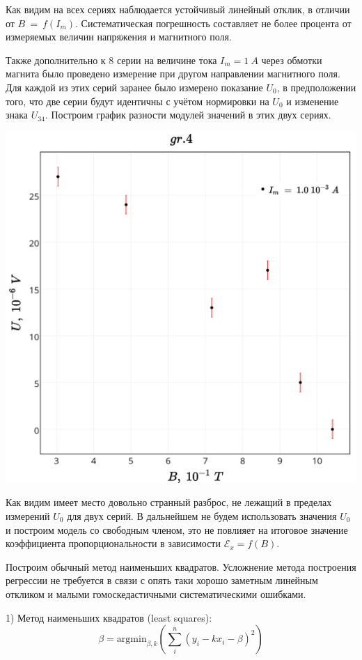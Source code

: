 Как видим на всех сериях наблюдается устойчивый линейный отклик, в отличии от $B~=~f(I_m)$. Систематическая погрешность составляет не более процента от измеряемых величин напряжения и магнитного поля. 

Также дополнительно к 8 серии на величине тока $I_m=1~A$ через обмотки магнита было проведено измерение при другом направлении магнитного поля. Для каждой из этих серий заранее было измерено показание $U_0$, в предположении того, что две серии будут идентичны с учётом нормировки на $U_0$ и изменение знака $U_{34}$. Построим график разности модулей значений в этих двух сериях.

\includegraphics[scale = 0.20]{my_plot4.png}

Как видим имеет место довольно странный разброс, не лежащий в пределах измерений $U_0$ для двух серий. В дальнейшем не будем использовать значения $U_0$ и построим модель со свободным членом, это не повлияет на итоговое значение коэффициента пропорциональности в зависимости $\mathscr{E}_x = f(B)$.

Построим обычный метод наименьших квадратов. Усложнение метода построения регрессии не требуется в связи с опять таки хорошо заметным линейным откликом и малыми гомоскедастичными систематическими ошибками.

1) Метод наименьших квадратов (least squares):
$$ \beta = \text{argmin}_{\beta, k}(\sum_i^n (y_i - k x_i - \beta)^2) $$

